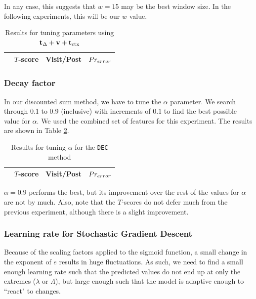 In any case, this suggests that $w=15$ may be the best window size. In the 
following experiments, this will be our $w$ value.

\begin{table}
	\footnotesize
\begin{center}
\begin{tabular}{| l | c | c | c |}
\hline
& $T$-score			   &	Visit/Post & 	$Pr_{error}$\\
\hline

\hline
\end{tabular}
\end{center}
\caption{Results for tuning parameters using $\mathbf{t}_\Delta+ \mathbf{v}+ 
\mathbf{t}_\text{ctx}$}\label{tbl:par_tune_comb}
\end{table}


\subsubsection{Decay factor}
In our discounted sum method, we have to tune the $\alpha$ parameter. We search 
through 0.1 to 0.9 (inclusive) with increments of 0.1 to find the best possible 
value for $\alpha$.  We used the combined set of features for this experiment.
The results are shown in Table \ref{tbl:par_tune_decay}.
\begin{table}
	\footnotesize
\begin{center}
\begin{tabular}{| l | c | c | c |}
\hline
& $T$-score			   &	Visit/Post & 	$Pr_{error}$\\
\hline
	
\hline
\end{tabular}
\end{center}
\caption{Results for tuning $\alpha$ for the \texttt{DEC} 
method}\label{tbl:par_tune_decay}
\end{table}

$\alpha=0.9$ performs the best, but its improvement over the rest of the values 
for $\alpha$ are not by much. Also, note that the $T$-scores do not defer much 
from the previous experiment, although there is a slight improvement.

\subsubsection{Learning rate for Stochastic Gradient Descent}

Because of the scaling factors applied to the sigmoid function, a small change 
in the exponent of $e$ results in huge fluctuations. As such, we need to find a 
small enough learning rate such that the predicted values do not end up at only 
the extremes ($\lambda$ or $\Lambda$), but large enough such that the model is 
adaptive enough to ``react" to changes.

